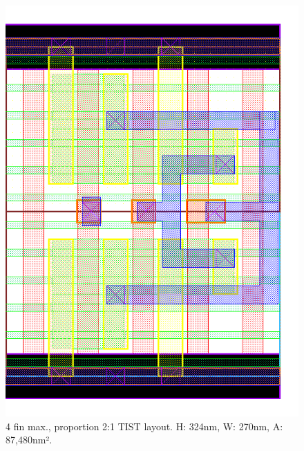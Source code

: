 \documentclass[diss,pgmicro,english]{iiufrgs}
\begin{document}
\begin{figure}[]
\centering
\includegraphics[width=\textwidth,height=\textheight,keepaspectratio]{TIST4F2F.png}
\caption{4 fin max., proportion 2:1 TIST layout. H: 324nm, W: 270nm, A: 87,480nm².}
\label{fig:TIST3F}
\end{figure}
\end{document}
